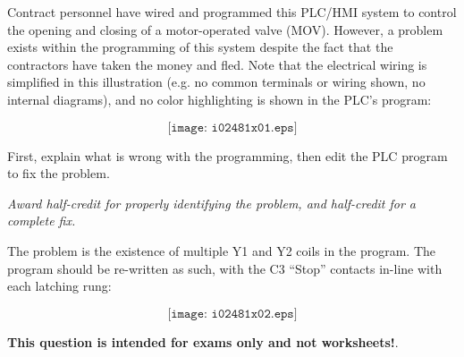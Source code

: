 

Contract personnel have wired and programmed this PLC/HMI system to control the opening and closing of a motor-operated valve (MOV).  However, a problem exists within the programming of this system despite the fact that the contractors have taken the money and fled.  Note that the electrical wiring is simplified in this illustration (e.g. no common terminals or wiring shown, no internal diagrams), and no color highlighting is shown in the PLC's program:

$$\texttt{[image: i02481x01.eps]}$$

First, explain what is wrong with the programming, then edit the PLC program to fix the problem.







{\it Award half-credit for properly identifying the problem, and half-credit for a complete fix.}

\vskip 10pt

The problem is the existence of multiple Y1 and Y2 coils in the program.  The program should be re-written as such, with the C3 ``Stop'' contacts in-line with each latching rung:

$$\texttt{[image: i02481x02.eps]}$$







{\bf This question is intended for exams only and not worksheets!}.


